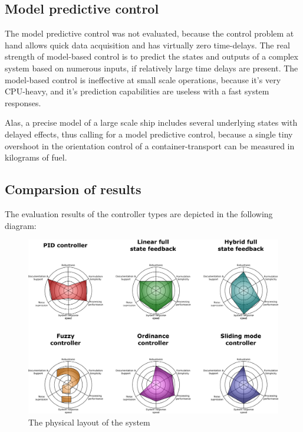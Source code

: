 \subsection{Model predictive control}

The model predictive control was not evaluated, because the control problem at hand allows quick data acquisition and has virtually zero time-delays. The real strength of model-based control is to predict the states and outputs of a complex system based on numerous inputs, if relatively large time delays are present. The model-based control is ineffective at small scale operations, because it’s very CPU-heavy, and it’s prediction capabilities are useless with a fast system responses.

Alas, a precise model of a large scale ship includes several underlying states with delayed effects, thus calling for a model predictive control, because a single tiny overshoot in the orientation control of a container-transport can be measured in kilograms of fuel.

\subsection{Comparsion of results}

The evaluation results of the controller types are depicted in the following diagram:

\begin{figure}[H]
	\centering
	\includegraphics[width=1\textwidth]{img2/ControlCompare}
	\caption{The physical layout of the system}
	\label{fig:PhysicalLayout}
\end{figure}

